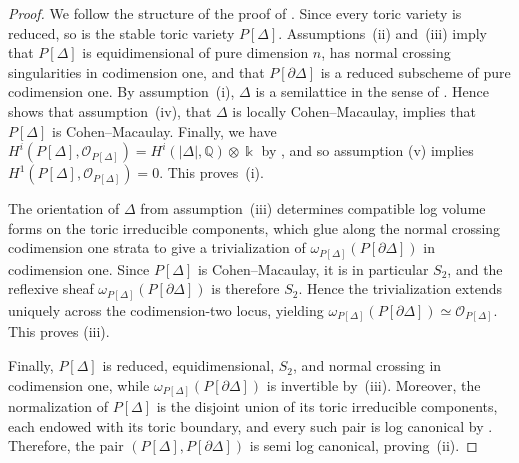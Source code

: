 \documentclass[12pt,letterpaper, reqno]{amsart}
\theoremstyle{defstyle} \newtheorem{definition}[theorem]{Definition}
\theoremstyle{remark}
\numberwithin{equation}{section}
\numberwithin{figure}{section}
\newcommand{\kk} {\Bbbk}
\newcommand{\cO} {\mathcal{O}}
\newcommand{\QQ} {\mathbb{Q}}
\begin{document}
\begin{proof}
We follow the structure of the proof of \cite[Lemma 17.1]{keel2024log}. Since every toric variety is reduced, so is the stable toric variety \(P[\Delta]\). Assumptions~(ii) and~(iii) imply that \(P[\Delta]\) is equidimensional of pure dimension \(n\), has normal crossing singularities in codimension one, and that \(P[\partial\Delta]\) is a reduced subscheme of pure codimension one. By assumption~(i), \(\Delta\) is a semilattice in the sense of \cite{Valeryannals}.
Hence \cite[Lemma 2.4.12]{Valeryannals} shows that assumption~(iv), that \(\Delta\) is locally Cohen--Macaulay, implies that \(P[\Delta]\) is Cohen--Macaulay. Finally, we have $H^i(P[\Delta], \cO_{P[\Delta]})=H^i(|\Delta|, \QQ) \otimes \kk$ by \cite[Theorem 2.5.6]{Valeryannals}, and so assumption (v) implies $H^1(P[\Delta], \cO_{P[\Delta]})=0$. This proves~(i).

The orientation of \(\Delta\) from assumption~(iii) determines compatible log volume forms on the toric irreducible components, which glue along the normal crossing codimension one strata to give a trivialization of
$\omega_{P[\Delta]}(P[\partial\Delta])$ in codimension one. Since \(P[\Delta]\) is Cohen--Macaulay, it is in particular $S_2$, and the reflexive sheaf \(\omega_{P[\Delta]}(P[\partial\Delta])\) is therefore \(S_2\). Hence the trivialization extends uniquely across the codimension-two locus, yielding
$\omega_{P[\Delta]}(P[\partial\Delta])\simeq \mathcal{O}_{P[\Delta]}$. This proves (iii).

Finally, \(P[\Delta]\) is reduced, equidimensional, \(S_2\), and normal crossing in codimension one, while \(\omega_{P[\Delta]}(P[\partial\Delta])\) is invertible by~(iii). Moreover, the normalization of \(P[\Delta]\) is the disjoint union of its toric irreducible components, each endowed with its toric boundary, and every such pair is log canonical by \cite[Corollary 11.4.25]{CLS}. Therefore, the pair \((P[\Delta],P[\partial\Delta])\) is semi log canonical, proving~(ii).
\end{proof}
\end{document}

